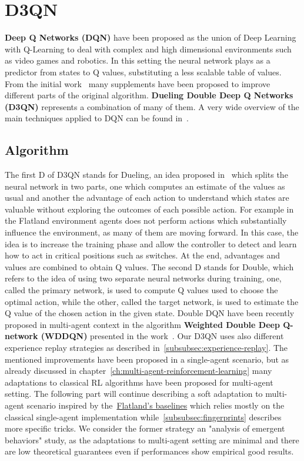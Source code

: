 \documentclass[11pt, a4paper, hidelinks]{report}
\begin{document}
\section{D3QN}\label{sec:d3qn}

\textbf{Deep Q Networks (DQN)} have been proposed as the union of Deep Learning with Q-Learning to deal with complex and high dimensional environments such as video games and robotics.
In this setting the neural network plays as a predictor from states to Q values, substituting a less scalable table of values.
From the initial work~\citep{dqn} many supplements have been proposed to improve different parts of the original algorithm.
\textbf{Dueling Double Deep Q Networks (D3QN)} represents a combination of many of them.
A very wide overview of the main techniques applied to DQN can be found in~\citep{rainbow}.

\subsection{Algorithm}\label{subsec:algorithm2}

The first D of D3QN stands for Dueling, an idea proposed in~\citep{dueling} which splits the neural network in two parts, one which computes an estimate of the values as usual and another the advantage of each action to understand which states are valuable without exploring the outcomes of each possible action.
For example in the Flatland environment agents does not perform actions which substantially influence the environment, as many of them are moving forward.
In this case, the idea is to increase the training phase and allow the controller to detect and learn how to act in critical positions such as switches.
At the end, advantages and values are combined to obtain Q values.
The second D stands for Double, which refers to the idea of using two separate neural networks during training, one, called the primary network, is used to compute Q values used to choose the optimal action, while the other, called the target network, is used to estimate the Q value of the chosen action in the given state.
Double DQN have been recently proposed in multi-agent context in the algorithm \textbf{Weighted Double Deep Q-network (WDDQN)} presented in the work~\citep{weighted-ddqn}.
Our D3QN uses also different experience replay strategies as described in~\ref{subsubsec:experience-replay}.
The mentioned improvements have been proposed in a single-agent scenario, but as already discussed in chapter~\ref{ch:multi-agent-reinforcement-learning} many adaptations to classical RL algorithms have been proposed for multi-agent setting.
The following part will continue describing a soft adaptation to multi-agent scenario inspired by the~\href{https://gitlab.aicrowd.com/flatland/flatland-examples}{Flatland's baselines} which relies mostly on the classical single-agent implementation while~\ref{subsubsec:fingerprints} describes more specific tricks.
We consider the former strategy an "analysis of emergent behaviors" study, as the adaptations to multi-agent setting are minimal and there are low theoretical guarantees even if performances show empirical good results.
\end{document}
